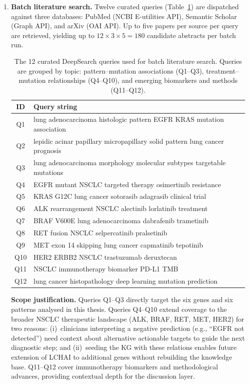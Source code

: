 \begin{enumerate}
    \item \textbf{Batch literature search.}
    Twelve curated queries (Table~\ref{tab:deepsearch_queries}) are
    dispatched against three databases: PubMed (NCBI E-utilities API),
    Semantic Scholar (Graph API), and arXiv (OAI API).
    Up to five papers per source per query are retrieved, yielding up
    to $12 \times 3 \times 5 = 180$ candidate abstracts per batch run.

\begin{table}[ht!]
\centering
\small
\caption{The 12 curated DeepSearch queries used for batch literature
search.  Queries are grouped by topic: pattern--mutation associations
(Q1--Q3), treatment--mutation relationships (Q4--Q10), and emerging
biomarkers and methods (Q11--Q12).}
\label{tab:deepsearch_queries}
\begin{tabular}{c l}
\hline
\textbf{ID} & \textbf{Query string} \\
\hline
Q1  & lung adenocarcinoma histologic pattern EGFR KRAS mutation association \\
Q2  & lepidic acinar papillary micropapillary solid pattern lung cancer prognosis \\
Q3  & lung adenocarcinoma morphology molecular subtypes targetable mutations \\
Q4  & EGFR mutant NSCLC targeted therapy osimertinib resistance \\
Q5  & KRAS G12C lung cancer sotorasib adagrasib clinical trial \\
Q6  & ALK rearrangement NSCLC alectinib lorlatinib treatment \\
Q7  & BRAF V600E lung adenocarcinoma dabrafenib trametinib \\
Q8  & RET fusion NSCLC selpercatinib pralsetinib \\
Q9  & MET exon 14 skipping lung cancer capmatinib tepotinib \\
Q10 & HER2 ERBB2 NSCLC trastuzumab deruxtecan \\
Q11 & NSCLC immunotherapy biomarker PD-L1 TMB \\
Q12 & lung cancer histopathology deep learning mutation prediction \\
\hline
\end{tabular}
\end{table}

    \textbf{Scope justification.}
    Queries Q1--Q3 directly target the six genes and six patterns
    analysed in this thesis.
    Queries Q4--Q10 extend coverage to the broader NSCLC therapeutic
    landscape (ALK, BRAF, RET, MET, HER2) for two reasons:
    (i)~clinicians interpreting a negative prediction
    (e.g., ``EGFR not detected'') need context about alternative
    actionable targets to guide the next diagnostic step; and
    (ii)~seeding the KG with these relations enables future extension
    of LCHAI to additional genes without rebuilding the knowledge base.
    Q11--Q12 cover immunotherapy biomarkers and methodological advances,
    providing contextual depth for the discussion layer.


\end{enumerate}
